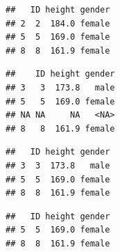 \documentclass[
]{book}
\newenvironment{Shaded}{\begin{snugshade}}{\end{snugshade}}
\newcommand{\CommentTok}[1]{\textcolor[rgb]{0.56,0.35,0.01}{\textit{#1}}}
\newcommand{\DecValTok}[1]{\textcolor[rgb]{0.00,0.00,0.81}{#1}}
\newcommand{\FunctionTok}[1]{\textcolor[rgb]{0.00,0.00,0.00}{#1}}
\newcommand{\NormalTok}[1]{#1}
\newcommand{\SpecialCharTok}[1]{\textcolor[rgb]{0.00,0.00,0.00}{#1}}
\newcommand{\StringTok}[1]{\textcolor[rgb]{0.31,0.60,0.02}{#1}}
\begin{document}
\begin{verbatim}
##   ID height gender
## 2  2  184.0 female
## 5  5  169.0 female
## 8  8  161.9 female
\end{verbatim}

\begin{Shaded}
\end{Shaded}

\begin{verbatim}
##    ID height gender
## 3   3  173.8   male
## 5   5  169.0 female
## NA NA     NA   <NA>
## 8   8  161.9 female
\end{verbatim}

\begin{Shaded}
\end{Shaded}

\begin{verbatim}
##   ID height gender
## 3  3  173.8   male
## 5  5  169.0 female
## 8  8  161.9 female
\end{verbatim}

\begin{Shaded}
\end{Shaded}

\begin{verbatim}
##   ID height gender
## 5  5  169.0 female
## 8  8  161.9 female
\end{verbatim}
\end{document}
